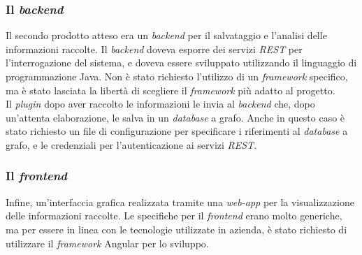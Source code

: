 \subsubsection*{Il \textit{backend}}
Il secondo prodotto atteso era un \textit{backend} per il salvataggio e l'analisi delle informazioni raccolte. 
Il \textit{backend} doveva esporre dei servizi \textit{REST} per l'interrogazione del sistema, e doveva essere sviluppato utilizzando
il linguaggio di programmazione Java. Non è stato richiesto l'utilizzo di un \textit{framework} specifico, ma è stato lasciata
la libertà di scegliere il \textit{framework} più adatto al progetto.\\
Il \textit{plugin} dopo aver raccolto le informazioni le invia al \textit{backend} che, dopo un'attenta elaborazione, le salva in un \textit{database} a grafo.
Anche in questo caso è stato richiesto un file di configurazione per specificare i riferimenti al \textit{database} a grafo, e le credenziali
per l'autenticazione ai servizi \textit{REST}.\\

\subsubsection*{Il \textit{frontend}}
Infine, un'interfaccia grafica realizzata tramite una \textit{web-app} per la visualizzazione delle informazioni raccolte.
Le specifiche per il \textit{frontend} erano molto generiche, ma per essere in linea con le tecnologie utilizzate in azienda,
è stato richiesto di utilizzare il \textit{framework} Angular per lo sviluppo.\\
